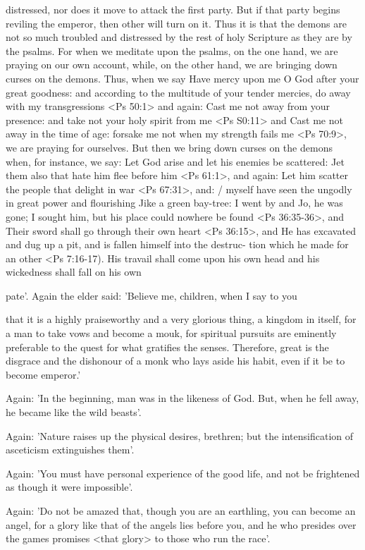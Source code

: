 distressed, nor does it move to attack the first party.
But if that
party begins reviling the emperor, then other will turn on it.
Thus
it is that the demons are not so much troubled and distressed by the
rest of holy Scripture as they are by the psalms.
For when we
meditate upon the psalms, on the one hand, we are praying on our
own account, while, on the other hand, we are bringing down curses
on the demons.
Thus, when we say Have mercy upon me O God
after your great goodness: and according to the multitude of your
tender mercies, do away with my transgressions <Ps 50:1> and
again: Cast me not away from your presence: and take not your
holy spirit from me <Ps S0:11> and Cast me not away in the time
of age: forsake me not when my strength fails me <Ps 70:9>, we are
praying for ourselves.
But then we bring down curses on the demons
when, for instance, we say: Let God arise and let his enemies be
scattered: Jet them also that hate him flee before him <Ps 61:1>, and
again: Let him scatter the people that delight in war <Ps 67:31>,
and: / myself have seen the ungodly in great power and flourishing
Jike a green bay-tree: I went by and Jo, he was gone; I sought him,
but his place could nowhere be found <Ps 36:35-36>, and Their
sword shall go through their own heart <Ps 36:15>, and He has
excavated and dug up a pit, and is fallen himself into the destruc-
tion which he made for an other <Ps 7:16-17).
His travail shall
come upon his own head and his wickedness shall fall on his own

pate'.
Again the elder said: 'Believe me, children, when I say to you

that it is a highly praiseworthy and a very glorious thing, a kingdom
in itself, for a man to take vows and become a mouk, for spiritual
pursuits are eminently preferable to the quest for what gratifies the
senses.
Therefore, great is the disgrace and the dishonour of a monk
who lays aside his habit, even if it be to become emperor.'

Again: 'In the beginning, man was in the likeness of God.
But,
when he fell away, he became like the wild beasts'.

Again: 'Nature raises up the physical desires, brethren; but the
intensification of asceticism extinguishes them'.

Again: 'You must have personal experience of the good life, and
not be frightened as though it were impossible'.

Again: 'Do not be amazed that, though you are an earthling,
you can become an angel, for a glory like that of the angels lies
before you, and he who presides over the games promises <that
glory> to those who run the race'.

